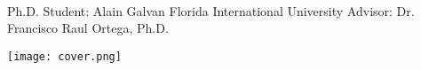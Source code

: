 \documentclass[10pt,a4paper]{article}
\begin{document}
 

\noindent \\ Ph.D. Student: Alain Galvan \bull Florida International University \bull Advisor: Dr. Francisco Raul Ortega, Ph.D.

\spacedhrule{1em}{0.5em}


\texttt{[image: cover.png]}
\begin{center}
\end{center}
\vspace{1em}
\end{document}
